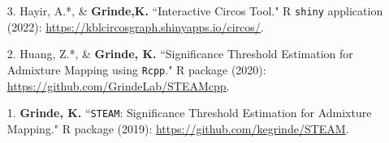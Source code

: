 \documentclass[margin]{res}
\begin{document}
\begin{resume}
\begin{itemize}
\item[3.] Hayir, A.*, \& \textbf{Grinde,K.} ``Interactive Circos Tool." R \texttt{shiny} application (2022): \href{https://kblcircosgraph.shinyapps.io/circos/}{https://kblcircosgraph.shinyapps.io/circos/}.

\item[2.] Huang, Z.*, \& \textbf{Grinde, K.} ``Significance Threshold Estimation for Admixture Mapping using \texttt{Rcpp}." R package (2020): \href{https://github.com/GrindeLab/STEAMcpp}{https://github.com/GrindeLab/STEAMcpp}.

\item[1.] \textbf{Grinde, K.} ``\texttt{STEAM}: Significance Threshold Estimation for Admixture Mapping." R package (2019): \href{https://github.com/kegrinde/STEAM}{https://github.com/kegrinde/STEAM}.\\
	
\end{itemize}







\end{resume}
\end{document}
